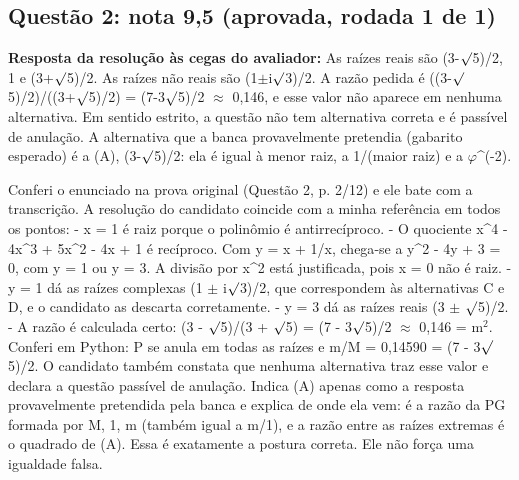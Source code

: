 \documentclass{article}%
\begin{document}
\subsection*{Questão 2: nota 9,5 (aprovada, rodada 1 de 1)}%
\textbf{Resposta da resolução às cegas do avaliador:} As raízes reais são (3-$\surd$5)/2, 1 e (3+$\surd$5)/2. As raízes não reais são (1$\pm$i$\surd$3)/2. A razão pedida é ((3-$\surd$5)/2)/((3+$\surd$5)/2) = (7-3$\surd$5)/2 $\approx$ 0,146, e esse valor não aparece em nenhuma alternativa. Em sentido estrito, a questão não tem alternativa correta e é passível de anulação. A alternativa que a banca provavelmente pretendia (gabarito esperado) é a (A), (3-$\surd$5)/2: ela é igual à menor raiz, a 1/(maior raiz) e a $\varphi$\^{}(-2).\par %
Conferi o enunciado na prova original (Questão 2, p. 2/12) e ele bate com a transcrição.\newline%
\newline%
A resolução do candidato coincide com a minha referência em todos os pontos:\newline%
{-} x = 1 é raiz porque o polinômio é antirrecíproco.\newline%
{-} O quociente x\^{}4 - 4x\^{}3 + 5x\^{}2 - 4x + 1 é recíproco. Com y = x + 1/x, chega{-}se a y\^{}2 - 4y + 3 = 0, com y = 1 ou y = 3. A divisão por x\^{}2 está justificada, pois x = 0 não é raiz.\newline%
{-} y = 1 dá as raízes complexas (1 $\pm$ i$\surd$3)/2, que correspondem às alternativas C e D, e o candidato as descarta corretamente.\newline%
{-} y = 3 dá as raízes reais (3 $\pm$ $\surd$5)/2.\newline%
{-} A razão é calculada certo: (3 - $\surd$5)/(3 + $\surd$5) = (7 - 3$\surd$5)/2 $\approx$ 0,146 = m$^2$.\newline%
\newline%
Conferi em Python: P se anula em todas as raízes e m/M = 0,14590 = (7 - 3$\surd$5)/2.\newline%
\newline%
O candidato também constata que nenhuma alternativa traz esse valor e declara a questão passível de anulação. Indica (A) apenas como a resposta provavelmente pretendida pela banca e explica de onde ela vem: é a razão da PG formada por M, 1, m (também igual a m/1), e a razão entre as raízes extremas é o quadrado de (A). Essa é exatamente a postura correta. Ele não força uma igualdade falsa.\newline%
\newline%
\end{document}
